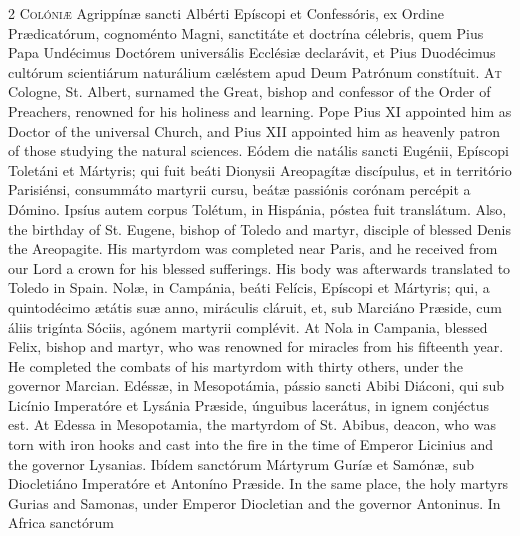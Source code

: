 \begin{paracol}{2}
\lettrine[lines=2]{C}{olóniæ} Agrippínæ 
 sancti Albérti Epíscopi et Confessóris, ex Ordine Prædicatórum, cognoménto 
 Magni, sanctitáte et doctrína célebris, quem Pius Papa Undécimus Doctórem 
 universális Ecclésiæ declarávit, et Pius Duodécimus cultórum scientiárum 
 naturálium cæléstem apud Deum Patrónum constítuit.
\switchcolumn
{}
\lettrine[lines=2]{A}{t} Cologne, St. Albert, surnamed the 
 Great, bishop and confessor of the Order of Preachers, renowned for his 
 holiness and learning. Pope Pius XI appointed him as Doctor of the 
 universal Church, and Pius XII appointed him as heavenly patron of those 
 studying the natural sciences.
\switchcolumn*
{}
Eódem die natális 
 sancti Eugénii, Epíscopi Toletáni et Mártyris; qui fuit beáti Dionysii 
 Areopagítæ discípulus, et in território Parisiénsi, consummáto martyrii 
 cursu, beátæ passiónis corónam percépit a Dómino. Ipsíus autem corpus 
 Tolétum, in Hispánia, póstea fuit translátum.
\switchcolumn
{}
Also, the birthday of St. Eugene, 
 bishop of Toledo and martyr, disciple of blessed Denis the Areopagite. 
 His martyrdom was completed near Paris, and he received from our Lord a 
 crown for his blessed sufferings. His body was afterwards translated 
 to Toledo in Spain.
\switchcolumn*
{}
Nolæ, in Campánia, beáti Felícis, Epíscopi et Mártyris; qui, a quintodécimo ætátis suæ anno, 
 miráculis cláruit, et, sub Marciáno Præside, cum áliis trigínta Sóciis, 
 agónem martyrii complévit.
\switchcolumn
{}
At Nola in Campania, blessed Felix, 
 bishop and martyr, who was renowned for miracles from his fifteenth year. 
 He completed the combats of his martyrdom with thirty others, under the 
 governor Marcian.
\switchcolumn*
{}
Edéssæ, in Mesopotámia, pássio sancti Abibi Diáconi, qui sub Licínio Imperatóre et Lysánia Præside, 
 únguibus lacerátus, in ignem conjéctus est.
\switchcolumn
{}
At Edessa in Mesopotamia, the 
 martyrdom of St. Abibus, deacon, who was torn with iron hooks and cast into 
 the fire in the time of Emperor Licinius and the governor Lysanias.
\switchcolumn*
{}
Ibídem sanctórum 
 Mártyrum Guríæ et Samónæ, sub Diocletiáno Imperatóre et Antoníno Præside.
\switchcolumn
{}
In the same place, the holy martyrs 
 Gurias and Samonas, under Emperor Diocletian and the governor Antoninus.
\switchcolumn*
{}
In Africa sanctórum 

\end{paracol}
